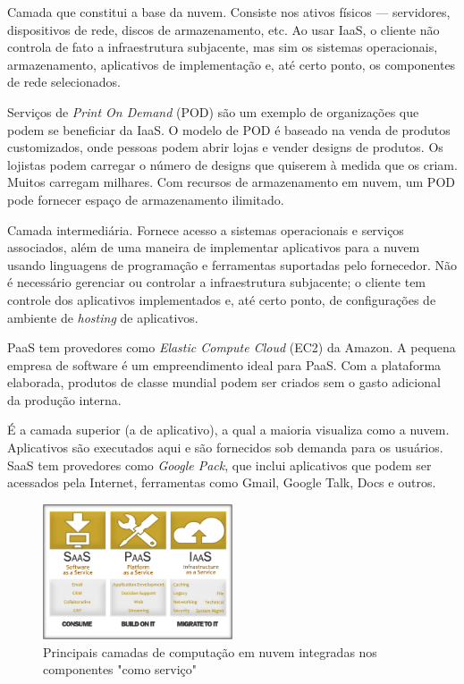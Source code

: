 \begin{itemise}

     Camada que constitui a base da 
    nuvem. Consiste nos ativos físicos --- servidores, dispositivos de rede, discos 
    de armazenamento, etc. Ao usar IaaS, o cliente não controla de fato a 
    infraestrutura subjacente, mas sim os sistemas operacionais, armazenamento, 
    aplicativos de implementação e, até certo ponto, os componentes de rede 
    selecionados. 

    Serviços de \emph{Print On Demand} (POD) são um exemplo de organizações que 
    podem se beneficiar da IaaS. O modelo de POD é baseado na venda de produtos 
    customizados, onde pessoas podem abrir lojas e vender designs de produtos. Os 
    lojistas podem carregar o número de designs que quiserem à medida que os criam. 
    Muitos carregam milhares. Com recursos de armazenamento em nuvem, um POD pode 
    fornecer espaço de armazenamento ilimitado.

     Camada intermediária. Fornece acesso a 
    sistemas operacionais e serviços associados, além de uma maneira de implementar 
    aplicativos para a nuvem usando linguagens de programação e ferramentas 
    suportadas pelo fornecedor. Não é necessário gerenciar ou controlar a 
    infraestrutura subjacente; o cliente tem controle dos aplicativos implementados 
    e, até certo ponto, de configurações de ambiente de \emph{hosting} de 
    aplicativos. 

    PaaS tem provedores como \emph{Elastic Compute Cloud} (EC2) da Amazon. A pequena 
empresa de software é um empreendimento ideal para PaaS. Com a plataforma elaborada,
produtos de classe mundial podem ser criados sem o gasto adicional da produção
interna.

     É a camada superior (a de aplicativo), a 
    qual a maioria visualiza como a nuvem. Aplicativos são executados aqui e são 
    fornecidos sob demanda para os usuários. SaaS tem provedores como \emph{Google 
    Pack}, que inclui aplicativos que podem ser acessados pela Internet, ferramentas 
    como Gmail, Google Talk, Docs e outros.

\end{itemise}

\begin{figure}[H]
    \centering
    \includegraphics[width=0.5\textwidth]{img/services2.png}
    \caption{Principais camadas de computação em nuvem integradas nos componentes
        "como serviço"~\cite{cloud-computing-fundamentals}
    }
    \label{fig:layers}
\end{figure}


